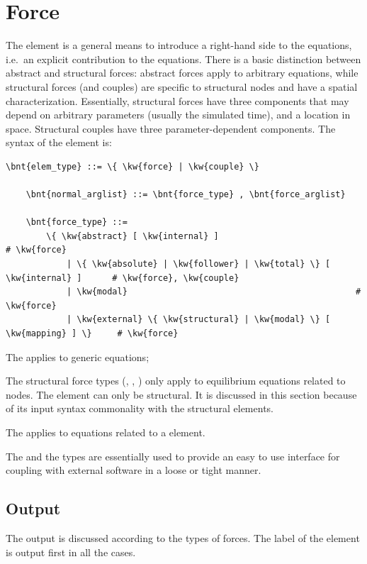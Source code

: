 \section{Force}\label{sec:EL:FORCE}
The  element is a general means to introduce 
a right-hand side to the equations, i.e.\ an explicit contribution
to the equations.
There is a basic distinction between abstract and structural forces:
abstract forces apply to arbitrary equations, while structural forces
(and couples) are specific to structural nodes and have
a spatial characterization.
Essentially, structural forces have three components
that may depend on arbitrary parameters (usually the simulated time),
and a location in space.
Structural couples have three parameter-dependent components.
The syntax of the  element is:
\begin{Verbatim}[commandchars=\\\{\}]
    \bnt{elem_type} ::= \{ \kw{force} | \kw{couple} \}

    \bnt{normal_arglist} ::= \bnt{force_type} , \bnt{force_arglist}

    \bnt{force_type} ::=
        \{ \kw{abstract} [ \kw{internal} ]                                 # \kw{force}
            | \{ \kw{absolute} | \kw{follower} | \kw{total} \} [ \kw{internal} ]      # \kw{force}, \kw{couple}
            | \kw{modal}                                             # \kw{force}
            | \kw{external} \{ \kw{structural} | \kw{modal} \} [ \kw{mapping} ] \}     # \kw{force}
\end{Verbatim}
The   applies to generic equations;

The structural force types (, , )
only apply to equilibrium equations
related to  nodes.
The  element can only be structural.
It is discussed in this section because of its input syntax commonality 
with the structural  elements.

The   applies to equations related
to a  element.

The  and the  types
are essentially used to provide an easy to use interface
for coupling with external software in a loose or tight manner.

\subsection{Output}
The output is discussed according to the types of forces. 
The label of the element is output first in all the cases.

